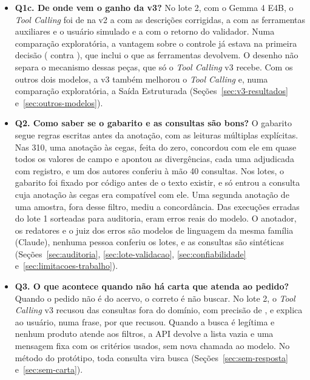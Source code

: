 \begin{itemize}
  \item \textbf{Q1c. De onde vem o ganho da v3?} No lote 2, com o Gemma 4 E4B, o \textit{Tool Calling} foi de  na v2 a  com as descrições corrigidas, a  com as ferramentas auxiliares e o usuário simulado e a  com o retorno do validador. Numa comparação exploratória, a vantagem sobre o controle já estava na primeira decisão ( contra ), que inclui o que as ferramentas devolvem. O desenho não separa o mecanismo dessas peças, que só o \textit{Tool Calling} v3 recebe. Com os outros dois modelos, a v3 também melhorou o \textit{Tool Calling} e, numa comparação exploratória, a Saída Estruturada (Seções~\ref{sec:v3-resultados} e~\ref{sec:outros-modelos}).
  \item \textbf{Q2. Como saber se o gabarito e as consultas são bons?} O gabarito segue regras escritas antes da anotação, com as leituras múltiplas explícitas. Nas 310, uma anotação às cegas, feita do zero, concordou com ele em quase todos os valores de campo e apontou as divergências, cada uma adjudicada com registro, e um dos autores conferiu à mão 40 consultas. Nos lotes, o gabarito foi fixado por código antes de o texto existir, e só entrou a consulta cuja anotação às cegas era compatível com ele. Uma segunda anotação de uma amostra, fora desse filtro, mediu a concordância. Das  execuções erradas do lote 1 sorteadas para auditoria,  eram erros reais do modelo. O anotador, os redatores e o juiz dos erros são modelos de linguagem da mesma família (Claude), nenhuma pessoa conferiu os lotes, e as consultas são sintéticas (Seções~\ref{sec:auditoria}, \ref{sec:lote-validacao}, \ref{sec:confiabilidade} e~\ref{sec:limitacoes-trabalho}).
  \item \textbf{Q3. O que acontece quando não há carta que atenda ao pedido?} Quando o pedido não é do acervo, o correto é não buscar. No lote 2, o \textit{Tool Calling} v3 recusou  das consultas fora do domínio, com precisão de , e explica ao usuário, numa frase, por que recusou. Quando a busca é legítima e nenhum produto atende aos filtros, a API devolve a lista vazia e uma mensagem fixa com os critérios usados, sem nova chamada ao modelo. No método do protótipo, toda consulta vira busca (Seções~\ref{sec:sem-resposta} e~\ref{sec:sem-carta}).

\end{itemize}
